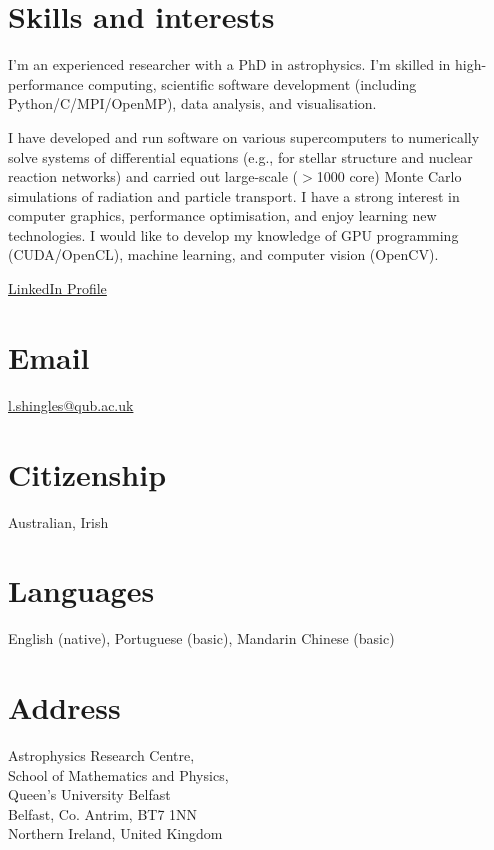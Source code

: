 \documentclass[11pt]{res} %
\begin{document}

\begin{resume}

\section{Skills and interests}
  I'm an experienced researcher with a PhD in astrophysics. I'm skilled in high-performance computing, scientific software development (including Python/C/MPI/OpenMP), data analysis, and visualisation.

  I have developed and run software on various supercomputers to numerically solve systems of differential equations (e.g., for stellar structure and nuclear reaction networks) and carried out large-scale ($>$1000 core) Monte Carlo simulations of radiation and particle transport. I have a strong interest in computer graphics, performance optimisation, and enjoy learning new technologies. I would like to develop my knowledge of GPU programming (CUDA/OpenCL), machine learning, and computer vision (OpenCV).

  \href{https://www.linkedin.com/in/lukeshingles/}{LinkedIn Profile}

\section{Email}
  \href{mailto:l.shingles@qub.ac.uk}{l.shingles@qub.ac.uk}

\section{Citizenship}
  Australian, Irish

\section{Languages}
  English (native), Portuguese (basic), Mandarin Chinese (basic)

\section{Address}
  Astrophysics Research Centre,\\
  School of Mathematics and Physics,\\
  Queen's University Belfast\\
  Belfast, Co. Antrim, BT7 1NN\\
  Northern Ireland, United Kingdom


\end{resume}
\end{document}
